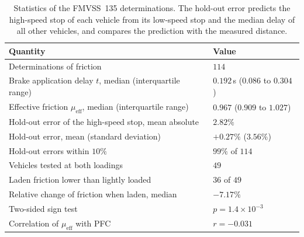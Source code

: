 \begin{table}[htbp]
\centering\small
\caption{Statistics of the FMVSS~135 determinations. The hold-out error predicts the high-speed stop of each vehicle from its low-speed stop and the median delay of all other vehicles, and compares the prediction with the measured distance.}\label{tab:app-fmvss-stats}
\begin{tabular}{>{\raggedright\arraybackslash}p{7.6cm}l}
\toprule
Quantity & Value\\
\midrule
Determinations of friction & $114$\\
Brake application delay $t$, median (interquartile range) & $0.192$\,s ($0.086$ to $0.304$)\\
Effective friction $\mu_{\mathrm{eff}}$, median (interquartile range) & $0.967$ ($0.909$ to $1.027$)\\
Hold-out error of the high-speed stop, mean absolute & $2.82\%$\\
Hold-out error, mean (standard deviation) & $+0.27\%$ ($3.56\%$)\\
Hold-out errors within $10\%$ & $99\%$ of $114$\\
Vehicles tested at both loadings & $49$\\
Laden friction lower than lightly loaded & $36$ of $49$\\
Relative change of friction when laden, median & $-7.17\%$\\
Two-sided sign test & $p=1.4\times10^{-3}$\\
Correlation of $\mu_{\mathrm{eff}}$ with PFC & $r=-0.031$\\
\bottomrule
\end{tabular}
\end{table}

